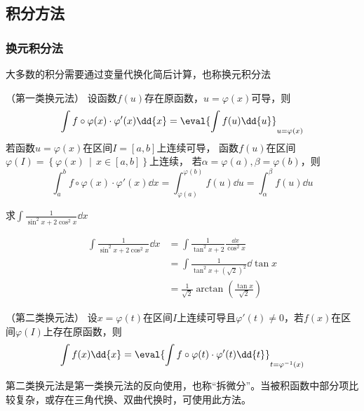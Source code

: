 \subsection{积分方法}
\subsubsection{换元积分法}
大多数的积分需要通过变量代换化简后计算，也称换元积分法
\begin{theorem}
    （第一类换元法）
    设函数$f(u)$存在原函数，$u=\varphi(x)$可导，则
    \[ \int f\circ\varphi(x)\cdot \varphi'(x)\dd{x} = \eval{\int f(u)\dd{u}}_{u=\varphi(x)} \]
    若函数$u=\varphi(x)$在区间$I=[a,b]$上连续可导，
    函数$f(u)$在区间$\varphi(I)=\left\{\varphi(x) \,\middle|\, x\in[a,b]\right\}$上连续，
    若$\alpha=\varphi(a),\beta=\varphi(b)$，则
    \[
        \int_a^b f\circ\varphi(x)\cdot\varphi'(x)\dd{x}
        =
        \int_{\varphi(a)}^{\varphi(b)} f(u)\dd{u}
        =
        \int_\alpha^\beta f(u)\dd{u}
    \]
\end{theorem}

\begin{example}
    求$\displaystyle\int \frac{1}{\sin^2 x + 2\cos^2 x}\dd{x}$
\end{example}
\begin{solution}
    \begin{align*}
        \int \frac{1}{\sin^2 x + 2\cos^2 x}\dd{x}
         & = \int \frac{1}{\tan^2 x + 2}\frac{\dd{x}}{\cos^2 x}            \\
         & = \int \frac{1}{\tan^2 x + (\sqrt{2})^2} \dd{\tan x}            \\
         & = \frac{1}{\sqrt{2}}\arctan\left(\frac{\tan x}{\sqrt{2}}\right)
    \end{align*}
\end{solution}


\begin{theorem}
    （第二类换元法）
    设$x=\varphi(t)$在区间$I$上连续可导且$\varphi'(t)\neq 0$，若$f(x)$在区间$\varphi(I)$上存在原函数，则
    \[ \int f(x)\dd{x} = \eval{\int f\circ\varphi(t)\cdot\varphi'(t)\dd{t}}_{t=\varphi^{-1}(x)} \]
\end{theorem}
\begin{situation}
    第二类换元法是第一类换元法的反向使用，也称“拆微分”。当被积函数中部分项比较复杂，或存在三角代换、双曲代换时，可使用此方法。
\end{situation}

